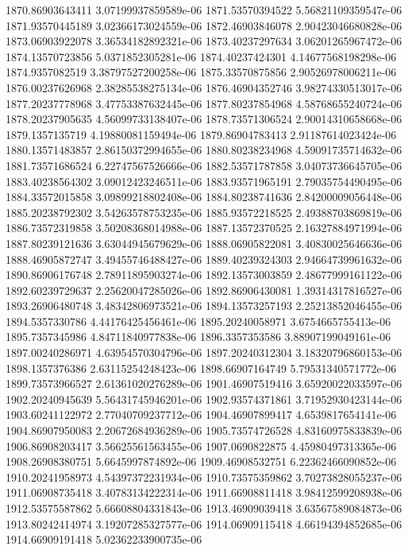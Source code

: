 {1870.86903643411 3.07199937859589e-06
1871.53570394522 5.56821109359547e-06
1871.93570445189 3.02366173024559e-06
1872.46903846078 2.90423046680828e-06
1873.06903922078 3.36534182892321e-06
1873.40237297634 3.06201265967472e-06
1874.13570723856 5.0371852305281e-06
1874.40237424301 4.14677568198298e-06
1874.9357082519 3.38797527200258e-06
1875.33570875856 2.90526978006211e-06
1876.00237626968 2.38285538275134e-06
1876.46904352746 3.98274330513017e-06
1877.20237778968 3.47753387632445e-06
1877.80237854968 4.58768655240724e-06
1878.20237905635 4.56099733138407e-06
1878.73571306524 2.90014310658668e-06
1879.1357135719 4.19880081159494e-06
1879.86904783413 2.91187614023424e-06
1880.13571483857 2.86150372994655e-06
1880.80238234968 4.59091735714632e-06
1881.73571686524 6.22747567526666e-06
1882.53571787858 3.04073736645705e-06
1883.40238564302 3.09012423246511e-06
1883.93571965191 2.79035754490495e-06
1884.33572015858 3.09899218802408e-06
1884.80238741636 2.84200009056448e-06
1885.20238792302 3.54263578753235e-06
1885.93572218525 2.49388703869819e-06
1886.73572319858 3.50208368014988e-06
1887.13572370525 2.16327884971994e-06
1887.80239121636 3.63044945679629e-06
1888.06905822081 3.40830025646636e-06
1888.46905872747 3.49455746488427e-06
1889.40239324303 2.94664739961632e-06
1890.86906176748 2.78911895903274e-06
1892.13573003859 2.48677999161122e-06
1892.60239729637 2.25620047285026e-06
1892.86906430081 1.39314317816527e-06
1893.26906480748 3.48342806973521e-06
1894.13573257193 2.25213852046455e-06
1894.5357330786 4.44176425456461e-06
1895.20240058971 3.6754665755413e-06
1895.7357345986 4.84711840977838e-06
1896.3357353586 3.88907199049161e-06
1897.00240286971 4.63954570304796e-06
1897.20240312304 3.18320796860153e-06
1898.1357376386 2.63115254248423e-06
1898.66907164749 5.79531340571772e-06
1899.73573966527 2.61361020276289e-06
1901.46907519416 3.65920022033597e-06
1902.20240945639 5.56431745946201e-06
1902.93574371861 3.71952930423144e-06
1903.60241122972 2.77040709237712e-06
1904.46907899417 4.6539817654141e-06
1904.86907950083 2.20672684936289e-06
1905.73574726528 4.83160975833839e-06
1906.86908203417 3.56625561563455e-06
1907.0690822875 4.45980497313365e-06
1908.26908380751 5.6645997874892e-06
1909.46908532751 6.22362466090852e-06
1910.20241958973 4.54397372231934e-06
1910.73575359862 3.70273828055237e-06
1911.06908735418 3.40783134222314e-06
1911.66908811418 3.98412599208938e-06
1912.53575587862 5.66608804331843e-06
1913.46909039418 3.63567589084873e-06
1913.80242414974 3.19207285327577e-06
1914.06909115418 4.66194394852685e-06
1914.66909191418 5.02362233900735e-06
}
